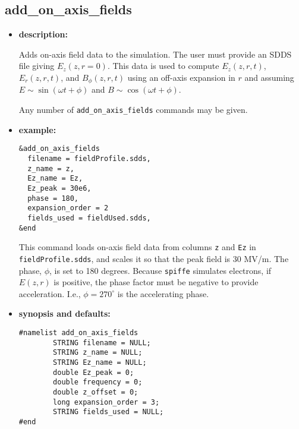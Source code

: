 %
\newpage

\subsection{add\_on\_axis\_fields}

\begin{itemize}

\item {\bf description:}

Adds on-axis field data to the simulation.  The user must provide an
SDDS file giving $E_z(z,r=0)$.  This data is used to compute
$E_z(z,r,t)$, $E_r(z,r,t)$, and $B_\phi(z,r,t)$ using an off-axis
expansion in $r$ and assuming $E \sim \sin
(\omega t + \phi)$ and $B \sim \cos (\omega t + \phi)$.

Any number of \verb|add_on_axis_fields| commands may be given.

\item {\bf example:} 
\begin{verbatim}
&add_on_axis_fields
  filename = fieldProfile.sdds,
  z_name = z,
  Ez_name = Ez,
  Ez_peak = 30e6,
  phase = 180,
  expansion_order = 2
  fields_used = fieldUsed.sdds,
&end
\end{verbatim}

This command loads on-axis field data from columns \verb|z| and
\verb|Ez| in \verb|fieldProfile.sdds|, and scales it so that the peak
field is 30 MV/m.  The phase, $\phi$, is set to 180 degrees.  Because
\verb|spiffe| simulates electrons, if $E(z,r)$ is positive, the phase
factor must be negative to provide acceleration.  I.e.,
$\phi=270^\circ$ is the accelerating phase.

\item {\bf synopsis and defaults:} 
\begin{verbatim}
#namelist add_on_axis_fields
        STRING filename = NULL;
        STRING z_name = NULL;
        STRING Ez_name = NULL;
        double Ez_peak = 0;
        double frequency = 0;
        double z_offset = 0;
        long expansion_order = 3;
        STRING fields_used = NULL;
#end
\end{verbatim}


\end{itemize}
